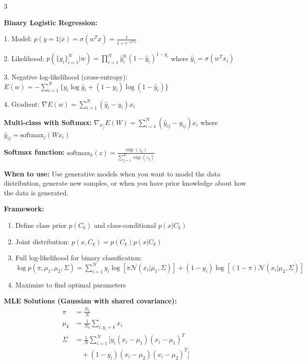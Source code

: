 \documentclass[10pt,landscape]{article}
\begin{document}
\begin{multicols}{3}
\begin{tcolorbox}[breakable, title=2.1 Logistic Regression Gradients, colback=classification,boxsep=1pt,left=1pt,right=1pt,top=1pt,bottom=1pt]
\textbf{Binary Logistic Regression:}

1. Model: $p(y=1|x) = \sigma(w^Tx) = \frac{1}{1+e^{-w^Tx}}$

2. Likelihood: $p(\{y_i\}_{i=1}^{N}|w) = \prod_{i=1}^{N}\hat{y}_i^{y_i}(1-\hat{y}_i)^{1-y_i}$
where $\hat{y}_i = \sigma(w^Tx_i)$

3. Negative log-likelihood (cross-entropy):
$E(w) = -\sum_{i=1}^{N}\{y_i\log\hat{y}_i + (1-y_i)\log(1-\hat{y}_i)\}$

4. Gradient: $\nabla E(w) = \sum_{i=1}^{N}(\hat{y}_i - y_i)x_i$

\textbf{Multi-class with Softmax:}
$\nabla_{w_j}E(W) = \sum_{i=1}^{N}(\hat{y}_{ij} - y_{ij})x_i$
where $\hat{y}_{ij} = \text{softmax}_j(Wx_i)$

\textbf{Softmax function:} $\text{softmax}_k(z) = \frac{\exp(z_k)}{\sum_{j=1}^K\exp(z_j)}$
\end{tcolorbox}

\begin{tcolorbox}[breakable, title=2.2 Generative Models for Classification, colback=classification,boxsep=1pt,left=1pt,right=1pt,top=1pt,bottom=1pt]
\textbf{When to use:} Use generative models when you want to model the data distribution, generate new samples, or when you have prior knowledge about how the data is generated.

\textbf{Framework:}
\begin{enumerate}[leftmargin=*,noitemsep,topsep=0pt]
    \item Define class prior $p(C_k)$ and class-conditional $p(x|C_k)$
    \item Joint distribution: $p(x, C_k) = p(C_k)p(x|C_k)$
    \item Full log-likelihood for binary classification:
    $\log p(\pi, \mu_1, \mu_2, \Sigma) = \sum_{i=1}^{N}y_i\log[\pi\mathcal{N}(x_i|\mu_1, \Sigma)] + (1-y_i)\log[(1-\pi)\mathcal{N}(x_i|\mu_2, \Sigma)]$
    \item Maximize to find optimal parameters
\end{enumerate}

\textbf{MLE Solutions (Gaussian with shared covariance):}
\begin{align}
\pi &= \frac{N_1}{N}\\
\mu_k &= \frac{1}{N_k}\sum_{i:y_i=k}x_i\\
\Sigma &= \frac{1}{N}\sum_{i=1}^{N}[y_i(x_i - \mu_1)(x_i - \mu_1)^T \\
&\quad + (1-y_i)(x_i - \mu_2)(x_i - \mu_2)^T]
\end{align}


\end{tcolorbox}
\end{multicols}
\end{document}
